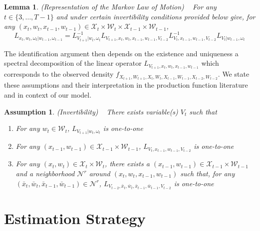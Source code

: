 \documentclass{article}
\newtheorem{assump}{Assumption}[section]
\newtheorem{lemma}{Lemma}[section]
\begin{document}
\begin{lemma} (Representation of the Markov Law of Motion)
~
For any $t\in\{3,\dots, T-1\}$ and under certain invertibility conditions provided below give, for any $(x_{t}, w_{t}, x_{t-1}, w_{t-1})\in \mathcal{X}_{t}\times \mathcal{W}_{t}\times \mathcal{X}_{t-1}\times \mathcal{W}_{t-1}$,
\begin{equation}\label{markovoperator}
L_{x_{t},w_{t},\omega_{t}|w_{t-1},\omega_{t-1}}=L^{-1}_{V_{t+1}|w_{t},\omega_{t}}L_{V_{t+1},x_{t},w_{t},x_{t-1}, w_{t-1}, V_{t-2}}L^{-1}_{V_{t},x_{t-1},w_{t-1},V_{t-2}}L_{V_{t}|w_{t-1},\omega_{t}}
\end{equation}
\end{lemma}

The identification argument then depends on the existence and uniqueness a spectral decomposition of the linear operator $L_{V_{t+1},x_{t}, w_{t}, x_{t-1}, w_{t-1}}$ which corresponds to the observed density $f_{X_{t+1}, W_{t+1}, X_{t}, W_{t}, X_{t-1}, W_{t-1}, X_{t-2}, W_{t-2}}$. We state these assumptions and their interpretation in the production function literature and in context of our model.

\begin{assump}(Invertibility)
~
There exists variable(s) $V_{t}$ such that
    \begin{enumerate}[label=\alph*)]
    \item For any $w_{t}\in \mathcal{W}_{t}$, $L_{V_{t+1}|w_{t}, \omega_{t}}$ is one-to-one
    \item For any $(x_{t-1}, w_{t-1})\in \mathcal{X}_{t-1}\times\mathcal{W}_{t-1}$, $L_{V_{t}, x_{t-1}, w_{t-1}, V_{t-2}}$ is one-to-one
    \item For any $(x_{t}, w_{t})\in \mathcal{X}_{t}\times\mathcal{W}_{t}$, there exists a $(x_{t-1}, w_{t-1})\in \mathcal{X}_{t-1}\times\mathcal{W}_{t-1}$ and a neighborhood $\mathcal{N}^{r}$ around $(x_{t}, w_{t}, x_{t-1}, w_{t-1})$ such that, for any $(\bar{x}_{t}, \bar{w}_{t}, \bar{x}_{t-1}, \bar{w}_{t-1})\in \mathcal{N}^{r}$, $L_{V_{t-2}, \bar{x}_{t}, \bar{w}_{t}, \bar{x}_{t-1}, \bar{w}_{t-1}, V_{t-2}}$ is one-to-one
    \end{enumerate}
\end{assump}



\section{Estimation Strategy}
\end{document}
